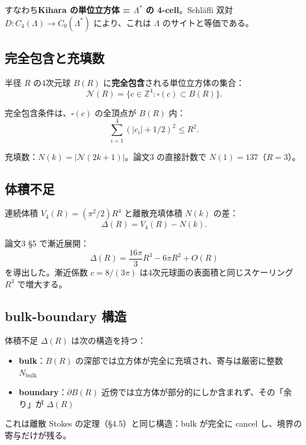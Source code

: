 \documentclass[a4paper,11pt]{ltjsarticle}
\begin{document}
すなわち\textbf{Kihara の単位立方体 = $\Lambda^*$ の 4-cell}。Schläfli 双対 $D : C_4(\Lambda) \to C_0(\Lambda^*)$ により、これは $\Lambda$ のサイトと等価である。

\subsection{完全包含と充填数}

半径 $R$ の4次元球 $B(R)$ に\textbf{完全包含}される単位立方体の集合：
\[ \mathcal{N}(R) = \{c \in \mathbb{Z}^4 : \square(c) \subset B(R)\}. \]

完全包含条件は、$\square(c)$ の全頂点が $B(R)$ 内：
\begin{equation}
\sum_{i=1}^{4} (|c_i| + 1/2)^2 \le R^2. \tag{5.2}
\end{equation}

充填数：$N(k) = |\mathcal{N}(2k+1)|$。論文3 の直接計数で $N(1) = 137$（$R=3$）。

\subsection{体積不足}

連続体積 $V_4(R) = (\pi^2/2) R^4$ と離散充填体積 $N(k)$ の差：
\begin{equation}
\Delta(R) = V_4(R) - N(k). \tag{5.3}
\end{equation}

論文3 §5 で漸近展開：
\begin{equation}
\Delta(R) = \frac{16\pi}{3} R^3 - 6\pi R^2 + O(R) \tag{5.4}
\end{equation}
を導出した。漸近係数 $c = 8/(3\pi)$ は4次元球面の表面積と同じスケーリング $R^3$ で増大する。

\subsection{bulk-boundary 構造}

体積不足 $\Delta(R)$ は次の構造を持つ：

\begin{itemize}
\item \textbf{bulk}：$B(R)$ の深部では立方体が完全に充填され、寄与は厳密に整数 $N_{\text{bulk}}$
\item \textbf{boundary}：$\partial B(R)$ 近傍では立方体が部分的にしか含まれず、その「余り」が $\Delta(R)$
\end{itemize}

これは離散 Stokes の定理（§4.5）と同じ構造：bulk が完全に cancel し、境界の寄与だけが残る。
\end{document}
